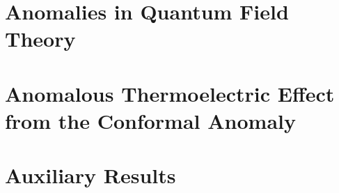 \documentclass[
fontsize=11pt,
paper=B5,
BCOR=5mm,
captions=tableheading,
]{scrbook}
\begin{document}
\chapter{Anomalies in Quantum Field Theory}


\chapter{Anomalous Thermoelectric Effect from the Conformal Anomaly}\label{ch:charge-current}






\appendix


\chapter{Auxiliary Results}\label{sec:aux-appendix}




\backmatter
\nocite{arjonaromanoNovelThermoelectricElastic2019}
\printbibliography[heading=bibintoc]

% 
\end{document}
